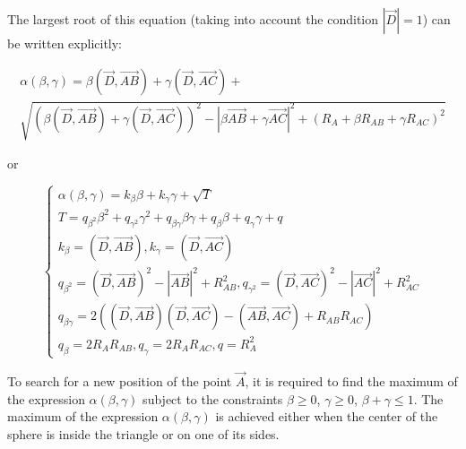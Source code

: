 \documentclass[
11pt,%
tightenlines,%
twoside,%
onecolumn,%
nofloats,%
nobibnotes,%
nofootinbib,%
superscriptaddress,%
noshowpacs,%
centertags]%
{revtex4}
\begin{document}
The largest root of this equation (taking into account the condition $|\vec{D}| = 1$) can be written explicitly:

\begin{multline}
\alpha(\beta, \gamma) = \beta (\vec{D}, \vec{AB}) + \gamma (\vec{D}, \vec{AC}) + \\
\sqrt{(\beta (\vec{D}, \vec{AB}) + \gamma (\vec{D}, \vec{AC}))^2 - |\beta \vec{AB} + \gamma \vec{AC}|^2 + (R_A + \beta R_{AB} + \gamma R_{AC})^2}
\end{multline}

or

\begin{equation}
\begin{cases}
\alpha(\beta, \gamma) = k_{\beta} \beta + k_{\gamma} \gamma + \sqrt{T} \\
T = q_{\beta^2} \beta^2 + q_{\gamma^2} \gamma^2 + q_{\beta \gamma} \beta \gamma + q_{\beta} \beta + q_{\gamma} \gamma + q \\
k_{\beta} = (\vec{D}, \vec{AB}), k_{\gamma} = (\vec{D}, \vec{AC}) \\
q_{\beta^2} = (\vec{D}, \vec{AB})^2 - |\vec{AB}|^2 + R_{AB}^2, q_{\gamma^2} = (\vec{D}, \vec{AC})^2 - |\vec{AC}|^2 + R_{AC}^2 \\
q_{\beta \gamma} = 2 ((\vec{D}, \vec{AB})(\vec{D}, \vec{AC}) - (\vec{AB}, \vec{AC}) + R_{AB} R_{AC}) \\
q_{\beta} = 2 R_A R_{AB}, q_{\gamma} = 2 R_A R_{AC}, q = R_A^2
\end{cases}
\end{equation}

To search for a new position of the point $\vec{A}$, it is required to find the maximum of the expression $\alpha(\beta, \gamma)$ subject to the constraints $\beta \ge 0$, $\gamma \ge 0$, $\beta + \gamma \le 1$.
The maximum of the expression $\alpha(\beta, \gamma)$ is achieved either when the center of the sphere is inside the triangle or on one of its sides.
\end{document}
